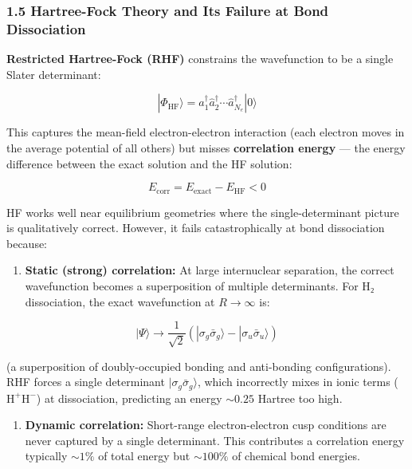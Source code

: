 \documentclass[
  11pt,
]{report}
\providecommand{\tightlist}{%
  \setlength{\itemsep}{0pt}\setlength{\parskip}{0pt}}
\begin{document}
\subsubsection{1.5 Hartree-Fock Theory and Its Failure at Bond
Dissociation}\label{hartree-fock-theory-and-its-failure-at-bond-dissociation}

\textbf{Restricted Hartree-Fock (RHF)} constrains the wavefunction to be
a single Slater determinant:

\[|\Phi_{\text{HF}}\rangle = \hat{a}_{1}^\dagger \hat{a}_{2}^\dagger \cdots \hat{a}_{N_e}^\dagger |0\rangle\]

This captures the mean-field electron-electron interaction (each
electron moves in the average potential of all others) but misses
\textbf{correlation energy} --- the energy difference between the exact
solution and the HF solution:

\[E_{\text{corr}} = E_{\text{exact}} - E_{\text{HF}} < 0\]

HF works well near equilibrium geometries where the single-determinant
picture is qualitatively correct. However, it fails catastrophically at
bond dissociation because:

\begin{enumerate}
\def\labelenumi{\arabic{enumi}.}
\tightlist
\item
  \textbf{Static (strong) correlation:} At large internuclear
  separation, the correct wavefunction becomes a superposition of
  multiple determinants. For H₂ dissociation, the exact wavefunction at
  \(R \to \infty\) is:
\end{enumerate}

\[|\Psi\rangle \to \frac{1}{\sqrt{2}}(|\sigma_g\bar{\sigma}_g\rangle - |\sigma_u\bar{\sigma}_u\rangle)\]

(a superposition of doubly-occupied bonding and anti-bonding
configurations). RHF forces a single determinant
\(|\sigma_g\bar{\sigma}_g\rangle\), which incorrectly mixes in ionic
terms (\(\text{H}^+\text{H}^-\)) at dissociation, predicting an energy
\(\sim 0.25\) Hartree too high.

\begin{enumerate}
\def\labelenumi{\arabic{enumi}.}
\setcounter{enumi}{1}
\tightlist
\item
  \textbf{Dynamic correlation:} Short-range electron-electron cusp
  conditions are never captured by a single determinant. This
  contributes a correlation energy typically \(\sim 1\%\) of total
  energy but \(\sim 100\%\) of chemical bond energies.
\end{enumerate}
\end{document}

